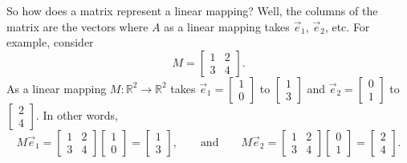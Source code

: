 So how does a matrix represent a linear mapping?
Well, the columns of the matrix are the vectors where $A$ as a linear
mapping takes $\vec{e}_1$, $\vec{e}_2$, etc.
For example, consider
\begin{equation*}
M = 
\begin{bmatrix}
1 & 2 \\ 3 & 4
\end{bmatrix} .
\end{equation*}
As a linear mapping $M \colon {\mathbb R}^2 \to {\mathbb R}^2$ takes
$\vec{e}_1 = \left[ \begin{smallmatrix} 1 \\ 0 \end{smallmatrix} \right]$ to
$\left[ \begin{smallmatrix} 1 \\ 3 \end{smallmatrix} \right]$
and
$\vec{e}_2 = \left[ \begin{smallmatrix} 0 \\ 1 \end{smallmatrix} \right]$ to
$\left[ \begin{smallmatrix} 2 \\ 4 \end{smallmatrix} \right]$.  In other
words,
\begin{equation*}
M \vec{e}_1 =
\begin{bmatrix}
1 & 2 \\ 3 & 4
\end{bmatrix}
\begin{bmatrix}
1 \\ 0
\end{bmatrix}
=
\begin{bmatrix}
1 \\ 3
\end{bmatrix},
\qquad
\text{and}
\qquad
M \vec{e}_2 =
\begin{bmatrix}
1 & 2 \\ 3 & 4
\end{bmatrix}
\begin{bmatrix}
0 \\ 1
\end{bmatrix}
=
\begin{bmatrix}
2 \\ 4
\end{bmatrix}.
\end{equation*}

